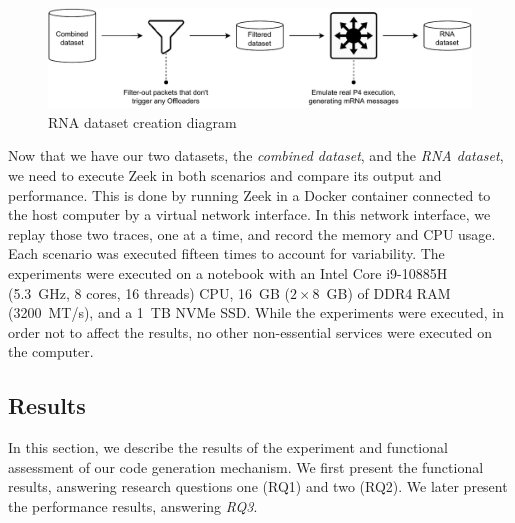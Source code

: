 \begin{figure}[htb]
    \caption{RNA dataset creation diagram}
    \begin{center}
        \includegraphics[width=1.0\textwidth]{images/rna_dataset_creation.pdf}  
    \end{center}
    \label{fig:rna_dataset_diagram}
\end{figure}

Now that we have our two datasets, the \textit{combined dataset}, and the \textit{RNA dataset}, we need to execute Zeek in both scenarios and compare its output and performance. This is done by running Zeek in a Docker container connected to the host computer by a virtual network interface. In this network interface, we replay those two traces, one at a time, and record the memory and CPU usage. Each scenario was executed fifteen times to account for variability. The experiments were executed on a notebook with an Intel Core i9-10885H (\SI{5.3}{GHz}, 8 cores, 16 threads) CPU, \SI{16}{GB} ($2 \times$\SI{8}{GB}) of DDR4 RAM (\SI{3200}{MT/s}), and a \SI{1}{TB} NVMe SSD. While the experiments were executed, in order not to affect the results, no other non-essential services were executed on the computer.





\subsection{Results}

In this section, we describe the results of the experiment and functional assessment of our code generation mechanism. We first present the functional results, answering research questions one (RQ1) and two (RQ2). We later present the performance results, answering \textit{RQ3}.

